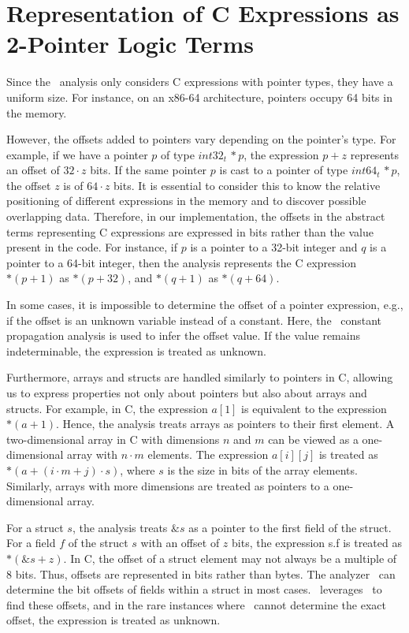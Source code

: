 

\section{Representation of C Expressions as 2-Pointer Logic Terms}

Since the \cpo\ analysis only considers C expressions with pointer types, they have a uniform size.
For instance, on an x86-64 architecture, pointers occupy 64 bits in the memory.

However, the offsets added to pointers vary depending on the pointer's type.
For example, if we have a pointer $p$ of type $int32_t\,*p$, the expression $p + z$ represents an offset of $32 \cdot z$ bits.
If the same pointer $p$ is cast to a pointer of type $int64_t\,*p$, the offset $z$ is of $64 \cdot z$ bits.
It is essential to consider this to know the relative positioning of
different expressions in the memory and to discover possible overlapping data.
Therefore, in our implementation, the offsets in the abstract terms representing C expressions are expressed in bits rather than the value present in the code.
For instance, if $p$ is a pointer to a 32-bit integer and $q$ is a pointer to a 64-bit integer, then the analysis represents the C expression $*(p + 1)$ as $*(p + 32)$, and $*(q + 1)$ as $*(q + 64)$.

In some cases, it is impossible to determine the offset of a pointer expression, e.g., if the offset is an unknown variable instead of a constant.
Here, the \goblint\ constant propagation analysis is used to infer the offset value.
If the value remains indeterminable, the expression is treated as unknown.

Furthermore, arrays and structs are handled similarly to pointers in C, allowing us to express properties not only about pointers but also about arrays and structs.
For example, in C, the expression $a[1]$ is equivalent to the expression $*(a + 1)$.
Hence, the analysis treats arrays as pointers to their first element.
A two-dimensional array in C with dimensions $n$ and $m$ can be viewed as a one-dimensional array with $n \cdot m$ elements.
The expression $a[i][j]$ is treated as $*(a + (i \cdot m + j) \cdot s)$, where $s$ is the size in bits of the array elements.
Similarly, arrays with more dimensions are treated as pointers to a one-dimensional array.

For a struct $s$, the analysis treats $\&s$ as a pointer to the first field of the struct.
For a field $f$ of the struct $s$ with an offset of $z$ bits,
the expression \textsf{s.f} is treated as $*(\&s + z)$.
In C, the offset of a struct element may not always be a multiple of 8 bits.
Thus, offsets are represented in bits rather than bytes.
The analyzer \goblint\ can determine the bit offsets of fields within a struct in most cases.
\cpo\ leverages \goblint\ to find these offsets, and in the rare instances where \goblint\ cannot determine the exact offset, the expression is treated as unknown.

